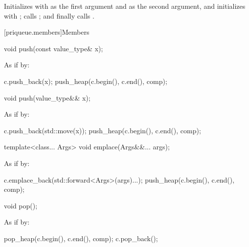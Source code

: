 \begin{itemdescr}
\pnum
\effects
Initializes  with
 as the first argument and
 as the second argument, and
initializes  with ;
calls ; and
finally calls .
\end{itemdescr}

[priqueue.members]{Members}

%
\begin{itemdecl}
void push(const value_type& x);
\end{itemdecl}

\begin{itemdescr}
\pnum
\effects
As if by:
\begin{codeblock}
c.push_back(x);
push_heap(c.begin(), c.end(), comp);
\end{codeblock}
\end{itemdescr}

%
\begin{itemdecl}
void push(value_type&& x);
\end{itemdecl}

\begin{itemdescr}
\pnum
\effects
As if by:
\begin{codeblock}
c.push_back(std::move(x));
push_heap(c.begin(), c.end(), comp);
\end{codeblock}
\end{itemdescr}

%
\begin{itemdecl}
template<class... Args> void emplace(Args&&... args);
\end{itemdecl}

\begin{itemdescr}
\pnum
\effects
As if by:
\begin{codeblock}
c.emplace_back(std::forward<Args>(args)...);
push_heap(c.begin(), c.end(), comp);
\end{codeblock}
\end{itemdescr}


%
\begin{itemdecl}
void pop();
\end{itemdecl}

\begin{itemdescr}
\pnum
\effects
As if by:
\begin{codeblock}
pop_heap(c.begin(), c.end(), comp);
c.pop_back();
\end{codeblock}
\end{itemdescr}

